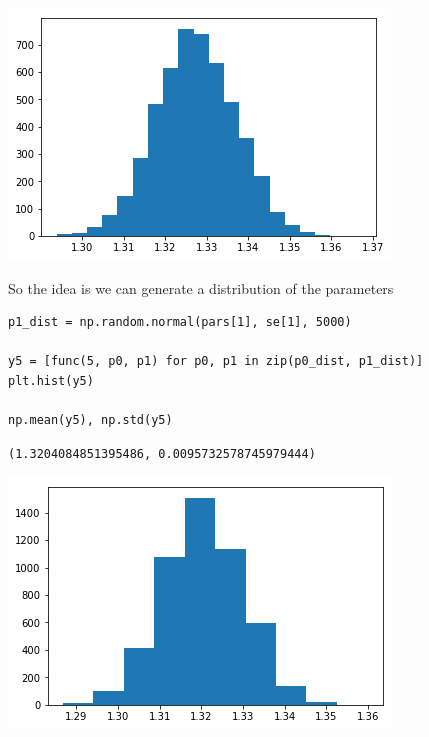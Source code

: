 \documentclass[11pt]{article}
\begin{document}
\begin{center}
\includegraphics[width=.9\linewidth]{obipy-resources/513154bd4a2746455cb8d249e9b62785-92704zlg.png}
\end{center}

So the idea is we can generate a distribution of the parameters

\begin{verbatim}
p1_dist = np.random.normal(pars[1], se[1], 5000)

y5 = [func(5, p0, p1) for p0, p1 in zip(p0_dist, p1_dist)]
plt.hist(y5)

np.mean(y5), np.std(y5)
\end{verbatim}

\begin{verbatim}
(1.3204084851395486, 0.0095732578745979444)
\end{verbatim}



\begin{center}
\includegraphics[width=.9\linewidth]{obipy-resources/513154bd4a2746455cb8d249e9b62785-92704N6s.png}
\end{center}
\end{document}

